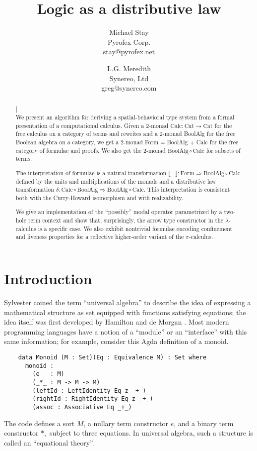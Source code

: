 \documentclass{llncs}
\title{Logic as a distributive law}
\author{
Michael Stay\\
  {Pyrofex Corp.}\\
  {\fontsize{8}{8}\selectfont stay@pyrofex.net}\\
\and
L.G. Meredith\\
  {Synereo, Ltd}\\
  {\fontsize{8}{8}\selectfont greg@synereo.com}
}
\newcommand{\interp}[1]{\llbracket #1 \rrbracket}
\newcommand{\maps}{\colon}
\newcommand{\Cat}{\mathrm{Cat}}
\newcommand{\Calc}{\mathrm{Calc}}
\newcommand{\BoolAlg}{\mathrm{BoolAlg}}
\renewcommand{\Form}{\mathrm{Form}}
\begin{document}
\maketitle
\begin{abstract}
\noindent
  [[Greg: fix up author block]]\\
  We present an algorithm for deriving a spatial-behavioral type system from a formal presentation of a computational calculus.  Given a 2-monad $\Calc\maps \Cat \to \Cat$ for the free calculus on a category of terms and rewrites and a 2-monad BoolAlg for the free Boolean algebra on a category, we get a 2-monad Form = BoolAlg + Calc for the free category of formulae and proofs.  We also get the 2-monad $\BoolAlg \circ \Calc$ for subsets of terms.

  The interpretation of formulae is a natural transformation $\interp{-} \maps \Form \Rightarrow \BoolAlg \circ \Calc$ defined by the units and multiplications of the monads and a distributive law transformation $\delta\maps \Calc \circ \BoolAlg \Rightarrow \BoolAlg \circ \Calc.$  This interpretation is consistent both with the Curry-Howard isomorphism and with realizability.

  We give an implementation of the ``possibly'' modal operator parametrized by a two-hole term context and show that, surprisingly, the arrow type constructor in the $\lambda$-calculus is a specific case.  We also exhibit nontrivial formulae encoding confinement and liveness properties for a reflective higher-order variant of the $\pi$-calculus.

\end{abstract}
\section{Introduction}

  Sylvester coined the term ``universal algebra'' to describe the idea of expressing a mathematical structure as set equipped with functions satisfying equations; the idea itself was first developed by Hamilton and de Morgan \cite{Graetzer}.  Most modern programming languages have a notion of a ``module'' or an ``interface'' with this same information; for example, consider this Agda definition of a monoid.
  \begin{verbatim}
    data Monoid (M : Set)(Eq : Equivalence M) : Set where
      monoid :
        (e   : M)
        (_*_ : M -> M -> M)
        (leftId : LeftIdentity Eq z _+_)
        (rightId : RightIdentity Eq z _+_)
        (assoc : Associative Eq _+_)
  \end{verbatim}
  The code defines a sort $M$, a nullary term constructor $e$, and a
  binary term constructor $*,$ subject to three equations. In
  universal algebra, such a structure is called an ``equational
  theory''.
\end{document}
